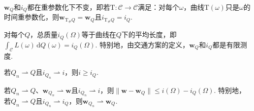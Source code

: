 \begin{proposition}\label{obj:4.7}
$\mathbf w_Q$和$i_Q$都在重参数化下不变，即若$\mathrm T:\mathscr C\to\mathscr C$满足：对每个$\omega$，曲线$\mathrm T(\omega)$只是$\omega$的时间重参数化，则$\mathbf w_{\mathrm T_\#Q}=\mathbf w_Q$且$i_{\mathrm T_\#Q}=i_Q$.

对每个$Q$，总质量$i_Q(\Omega)$等于曲线在$Q$下的平均长度，即$\int_{\mathscr C}L(\omega)\,\mathrm dQ(\omega)=i_Q(\Omega)$. 特别地，由交通方案的定义，$\mathbf w_Q$和$i_Q$都是有限测度.

若$Q_n\rightharpoonup Q$且$i_{Q_n}\rightharpoonup i$，则$i\geq i_Q$.

若$Q_n\rightharpoonup Q$、$\mathbf w_{Q_n}\rightharpoonup\mathbf w$且$i_{Q_n}\rightharpoonup i$，则$\|\mathbf w-\mathbf w_Q\|\leq i(\Omega)-i_Q(\Omega)$. 特别地，若$Q_n\rightharpoonup Q$且$i_{Q_n}\rightharpoonup i_Q$，则$\mathbf w_{Q_n}\rightharpoonup\mathbf w_Q$.
\end{proposition}
